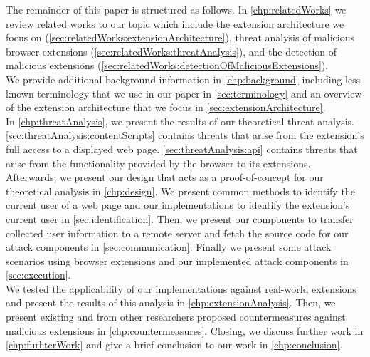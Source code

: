 	The remainder of this paper is structured as follows. In \autoref{chp:relatedWorks} we review related works to our topic which include the extension architecture we focus on (\autoref{sec:relatedWorks:extensionArchitecture}), threat analysis of malicious browser extensions (\autoref{sec:relatedWorks:threatAnalysis}), and the detection of malicious extensions (\autoref{sec:relatedWorks:detectionOfMaliciousExtensions}). \\
	We provide additional background information in \autoref{chp:background} including less known terminology that we use in our paper in \autoref{sec:terminology} and an overview of the extension architecture that we focus in \autoref{sec:extensionArchitecture}. \\
	In \autoref{chp:threatAnalysis}, we present the results of our theoretical threat analysis. \autoref{sec:threatAnalysis:contentScripts} contains threats that arise from the extension's full access to a displayed web page. \autoref{sec:threatAnalysis:api} contains threats that arise from the functionality provided by the browser to its extensions. \\
	Afterwards, we present our design that acts as a proof-of-concept for our theoretical analysis in \autoref{chp:design}. We present common methods to identify the current user of a web page and our implementations to identify the extension's current user in \autoref{sec:identification}. Then, we present our components to transfer collected user information to a remote server and fetch the source code for our attack components in \autoref{sec:communication}.  Finally we present some attack scenarios using browser extensions and our implemented attack components in \autoref{sec:execution}. \\
	We tested the applicability of our implementations against real-world extensions and present the results of this analysis in \autoref{chp:extensionAnalysis}.
	Then, we present existing and from other researchers proposed countermeasures against malicious extensions in \autoref{chp:countermeasures}.
	Closing, we discuss further work in \autoref{chp:furhterWork} and give a brief conclusion to our work in \autoref{chp:conclusion}.
	